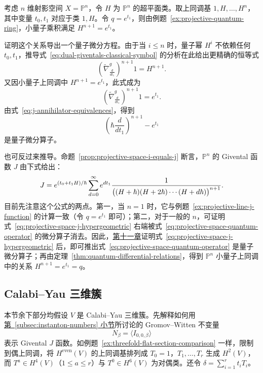 \begin{example}\label{ex:second-order-quantum-relations}
考虑 $n$ 维射影空间 $X=\mathbb P^n$，令 $H$ 为 $\mathbb P^n$ 的超平面类。取上同调基 $1,H,\ldots,H^n$，其中变量 $t_0,t_1$ 对应于类 $1,H$。令 $q=e^{t_1}$，则由例题~\ref{ex:projective-quantum-ring}，小量子乘积满足 $H^{n+1}=e^{t_1}$。

证明这个关系导出一个量子微分方程。由于当 $i\le n$ 时，量子幂 $H^i$ 不依赖任何 $t_0,t_1$，推导式~\eqref{eq:dual-giventals-classical-symbol} 的分析在此给出更精确的恒等式
\[
\left(\widetilde\nabla^g_{\frac d{dt_1}}\right)^{n+1}1=H^{n+1}.
\]
又因小量子上同调中 $H^{n+1}=e^{t_1}$，此式成为
\[
\left(\widetilde\nabla^g_{\frac d{dt_1}}\right)^{n+1}1=e^{t_1}.
\]
由式~\eqref{eq:j-annihilator-equivalences}，得到
\begin{equation}\label{eq:projective-space-quantum-operator}
\left(\hbar\frac d{dt_1}\right)^{n+1}-e^{t_1}
\end{equation}
是量子微分算子。

也可反过来推导。命题~\ref{prop:projective-space-i-equals-j} 断言，$\mathbb P^n$ 的 Givental 函数 $J$ 由下式给出：
\begin{equation}\label{eq:projective-space-j-hypergeometric}\index{Givental $J$ 函数!射影空间|hyperpage}
J=e^{(t_0+t_1H)/\hbar}\sum_{d=0}^{\infty}e^{dt_1}
\frac1{\bigl((H+\hbar)(H+2\hbar)\cdots(H+d\hbar)\bigr)^{n+1}}.
\end{equation}
目前先注意这个公式的两点。第一，当 $n=1$ 时，它与例题~\ref{ex:projective-line-j-function} 的计算一致（令 $q=e^{t_1}$ 即可）；第二，对于一般的 $n$，可证明式~\eqref{eq:projective-space-j-hypergeometric} 右端被式~\eqref{eq:projective-space-quantum-operator} 的微分算子消去。因此，\hyperref[chap:mirror-theorem]{第十一章}证明式~\eqref{eq:projective-space-j-hypergeometric} 后，即可推出式~\eqref{eq:projective-space-quantum-operator} 是量子微分算子；再由定理~\ref{thm:quantum-differential-relations}，得到 $\mathbb P^n$ 小量子上同调中的关系 $H^{n+1}=e^{t_1}=q$。
\end{example}

\subsection{Calabi--Yau 三维簇}\label{subsec:cy-threefold-j-function}
本节余下部分均假设 $V$ 是 Calabi--Yau 三维簇。先解释如何用\hyperref[subsec:instanton-numbers]{第~\ref*{subsec:instanton-numbers} 小节}所讨论的 Gromov--Witten 不变量
\[
N_\beta=\langle I_{0,0,\beta}\rangle
\]
表示 Givental $J$ 函数。如例题~\ref{ex:threefold-flat-section-comparison} 一样，限制到偶上同调，将 $H^{\mathrm{even}}(V)$ 的上同调基排列成 $T_0=1$，$T_1,\ldots,T_r$ 生成 $H^2(V)$，而 $T^a\in H^4(V)$（$1\le a\le r$）与 $T^0\in H^6(V)$ 为对偶类。还令 $\delta=\sum_{i=1}^rt_iT_i$。

